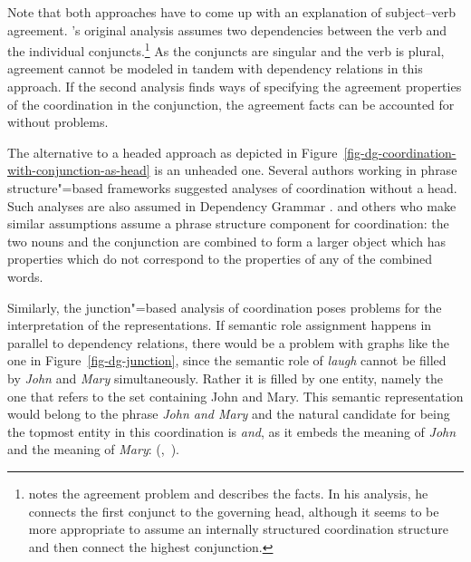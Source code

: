 Note that both approaches have to come up with an explanation of subject--verb agreement. \tes's
original analysis assumes two dependencies between the verb and the individual conjuncts.\footnote{
  \citet[]{Eroms2000a} notes the agreement problem and describes the facts. In his
  analysis, he connects the first conjunct to the governing head, although it seems to be more
  appropriate to assume an internally structured coordination structure and then connect the highest conjunction.
} As the conjuncts are singular and the verb is plural, agreement cannot be modeled in tandem with dependency
relations in this approach. 
If the second analysis finds ways of specifying the agreement properties
of the coordination in the conjunction, the agreement facts can be accounted for without problems.

The alternative to a headed approach as depicted in Figure~\ref{fig-dg-coordination-with-conjunction-as-head} is an unheaded one. Several authors
working in phrase structure"=based frameworks suggested analyses of coordination without a
head. Such analyses are also assumed in Dependency Grammar
\citep{Hudson88a,Kahane97a}. \citet{Hudson88a} and others who make similar assumptions assume a phrase structure component for
coordination: 
the two nouns and the conjunction are combined to form a larger object which has properties which
do not correspond to the properties of any of the combined words.


Similarly, the junction"=based analysis of coordination poses problems for the interpretation of the
representations. If semantic role assignment happens in parallel to dependency relations, there would be a
problem with graphs like the one in Figure~\ref{fig-dg-junction}, since the semantic role of \emph{laugh} cannot be
filled by \emph{John} and \emph{Mary} simultaneously. Rather it is filled by one entity, namely the
one that refers to the set containing John and Mary. This semantic representation would belong to
the phrase \emph{John and Mary} and the natural candidate for being the topmost entity in this
coordination is \emph{and}, as it embeds the meaning of \emph{John} and the meaning of
\emph{Mary}: (,~).


